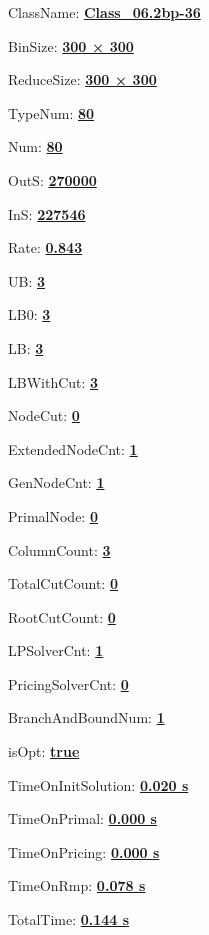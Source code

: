 \documentclass[11pt]{article}
\begin{document}
\pagestyle{empty}


ClassName: \underline{\textbf{Class_06.2bp-36}}
\par
BinSize: \underline{\textbf{300 × 300}}
\par
ReduceSize: \underline{\textbf{300 × 300}}
\par
TypeNum: \underline{\textbf{80}}
\par
Num: \underline{\textbf{80}}
\par
OutS: \underline{\textbf{270000}}
\par
InS: \underline{\textbf{227546}}
\par
Rate: \underline{\textbf{0.843}}
\par
UB: \underline{\textbf{3}}
\par
LB0: \underline{\textbf{3}}
\par
LB: \underline{\textbf{3}}
\par
LBWithCut: \underline{\textbf{3}}
\par
NodeCut: \underline{\textbf{0}}
\par
ExtendedNodeCnt: \underline{\textbf{1}}
\par
GenNodeCnt: \underline{\textbf{1}}
\par
PrimalNode: \underline{\textbf{0}}
\par
ColumnCount: \underline{\textbf{3}}
\par
TotalCutCount: \underline{\textbf{0}}
\par
RootCutCount: \underline{\textbf{0}}
\par
LPSolverCnt: \underline{\textbf{1}}
\par
PricingSolverCnt: \underline{\textbf{0}}
\par
BranchAndBoundNum: \underline{\textbf{1}}
\par
isOpt: \underline{\textbf{true}}
\par
TimeOnInitSolution: \underline{\textbf{0.020 s}}
\par
TimeOnPrimal: \underline{\textbf{0.000 s}}
\par
TimeOnPricing: \underline{\textbf{0.000 s}}
\par
TimeOnRmp: \underline{\textbf{0.078 s}}
\par
TotalTime: \underline{\textbf{0.144 s}}
\par
\newpage
\end{document}
